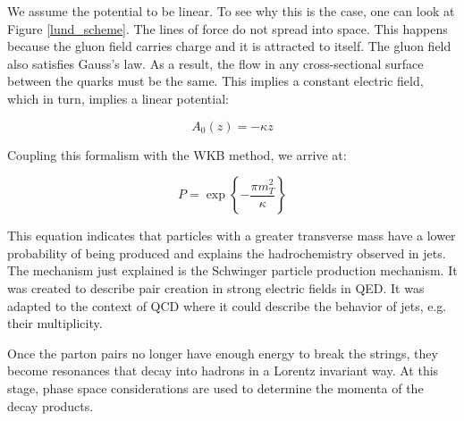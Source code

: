 We assume the potential to be linear. To see why this is the case, one can look at Figure \ref{lund_scheme}. The lines of force do not spread into space. This happens because the gluon field carries charge and it is attracted to itself. The gluon field also satisfies Gauss's law. As a result, the flow in any cross-sectional surface between the quarks must be the same. This implies a constant electric field, which in turn, implies a linear potential:

\begin{equation}
A_0(z) = -\kappa z
\end{equation}

Coupling this formalism with the WKB method, we arrive at\cite{wong_introduction_1994}:

\begin{equation}
P = \exp \left\{ - \frac{\pi m_T^2}{\kappa} \right\}
\end{equation}

This equation indicates that particles with a greater transverse mass have a lower probability of being produced and explains the hadrochemistry observed in jets. The mechanism just explained is the Schwinger particle production mechanism. It was created to describe pair creation in strong electric fields in QED. It was adapted to the context of QCD where it could describe the behavior of jets, e.g. their multiplicity.
\par
Once the parton pairs no longer have enough energy to break the strings, they become resonances that decay into hadrons in a Lorentz invariant way. At this stage, phase space considerations are used to determine the momenta of the decay products\cite{sjostrand_pythia_2006}.